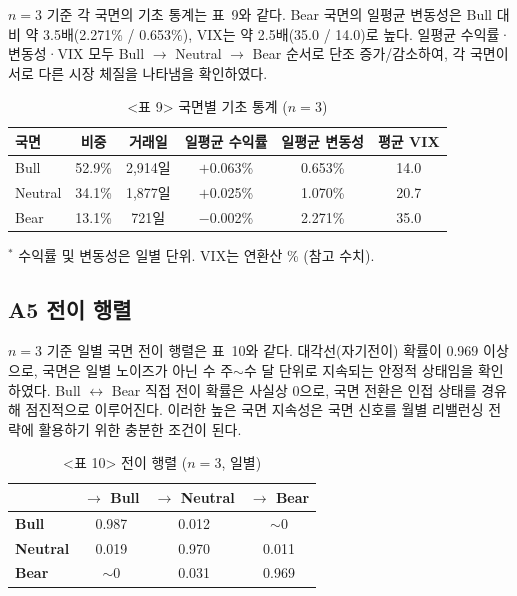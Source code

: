 \documentclass{article}
\begin{document}
$n = 3$ 기준 각 국면의 기초 통계는 표~9와 같다. Bear 국면의 일평균 변동성은 Bull 대비 약 3.5배(2.271\% / 0.653\%), VIX는 약 2.5배(35.0 / 14.0)로 높다. 일평균 수익률·변동성·VIX 모두 Bull $\rightarrow$ Neutral $\rightarrow$ Bear 순서로 단조 증가/감소하여, 각 국면이 서로 다른 시장 체질을 나타냄을 확인하였다.

\begin{table}[ht]
\centering
\caption{<표 9> 국면별 기초 통계 ($n=3$)}
\label{tab:a1_stats}
\begin{tabular}{lccccc}
\toprule
\textbf{국면} & \textbf{비중} & \textbf{거래일} & \textbf{일평균 수익률} & \textbf{일평균 변동성} & \textbf{평균 VIX} \\
\midrule
Bull    & 52.9\% & 2,914일 & $+$0.063\% & 0.653\% & 14.0 \\
Neutral & 34.1\% & 1,877일 & $+$0.025\% & 1.070\% & 20.7 \\
Bear    & 13.1\% &   721일 & $-$0.002\% & 2.271\% & 35.0 \\
\bottomrule
\end{tabular}
\begin{flushleft}
{\small $^*$ 수익률 및 변동성은 일별 단위. VIX는 연환산 \% (참고 수치).}
\end{flushleft}
\end{table}

\subsection*{A5 전이 행렬}

$n = 3$ 기준 일별 국면 전이 행렬은 표~10와 같다. 대각선(자기전이) 확률이 0.969 이상으로, 국면은 일별 노이즈가 아닌 수 주$\sim$수 달 단위로 지속되는 안정적 상태임을 확인하였다. Bull $\leftrightarrow$ Bear 직접 전이 확률은 사실상 0으로, 국면 전환은 인접 상태를 경유해 점진적으로 이루어진다. 이러한 높은 국면 지속성은 국면 신호를 월별 리밸런싱 전략에 활용하기 위한 충분한 조건이 된다.

\begin{table}[ht]
\centering
\caption{<표 10> 전이 행렬 ($n=3$, 일별)}
\label{tab:a1_trans}
\begin{tabular}{lccc}
\toprule
 & \textbf{$\rightarrow$ Bull} & \textbf{$\rightarrow$ Neutral} & \textbf{$\rightarrow$ Bear} \\
\midrule
\textbf{Bull}    & 0.987 & 0.012 & $\sim$0 \\
\textbf{Neutral} & 0.019 & 0.970 & 0.011 \\
\textbf{Bear}    & $\sim$0 & 0.031 & 0.969 \\
\bottomrule
\end{tabular}
\end{table}
\end{document}
